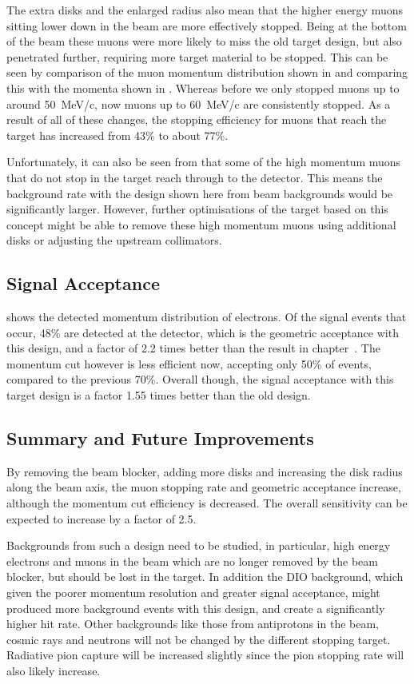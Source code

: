 The extra disks and the enlarged radius also mean that the higher energy muons sitting lower down in the beam are more effectively stopped.
Being at the bottom of the beam these muons were more likely to miss the old target design, but also penetrated further, requiring more target material to be stopped.
This can be seen by comparison of the muon momentum distribution shown in  and comparing this with the momenta shown in .
Whereas before we only stopped muons up to around 50~MeV/c, now muons up to 60~MeV/c are consistently stopped.
As a result of all of these changes, the stopping efficiency for muons that reach the target has increased from 43\% to about 77\%.

Unfortunately, it can also be seen from  that some of the high momentum muons that do not stop in the target reach through to the detector.
This means the background rate with the design shown here from beam backgrounds would be significantly larger.
However, further optimisations of the target based on this concept might be able to remove these high momentum muons using additional disks or adjusting the upstream collimators.

\subsection{Signal Acceptance}
 shows the detected momentum distribution of electrons.
Of the signal events that occur, 48\% are detected at the detector, which is the geometric acceptance with this design, and a factor of 2.2 times better than the result in chapter~.
The momentum cut however is less efficient now, accepting only 50\% of events, compared to the previous 70\%.  
Overall though, the signal acceptance with this target design is a factor 1.55 times better than the old design.

\subsection{Summary and Future Improvements}
By removing the beam blocker, adding more disks and increasing the disk radius along the beam axis, the muon stopping rate and geometric acceptance increase, although the momentum cut efficiency is decreased.
The overall sensitivity can be expected to increase by a factor of 2.5.

Backgrounds from such a design need to be studied, in particular, high energy electrons and muons in the beam which are no longer removed by the beam blocker, but should be lost in the target.
In addition the \ac{DIO} background, which given the poorer momentum resolution and greater signal acceptance, might produced more background events with this design, and create a significantly higher hit rate.
Other backgrounds like those from antiprotons in the beam, cosmic rays and neutrons will not be changed by the different stopping target.
Radiative pion capture will be increased slightly since the pion stopping rate will also likely increase.

